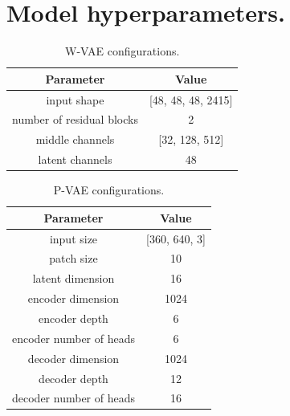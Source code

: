 \documentclass{article}
\theoremstyle{plain}
\theoremstyle{definition}
\theoremstyle{remark}
\begin{document}
\section{Model hyperparameters.}\label{app:model}

\begin{table}[htb!]
\centering
\begin{tabular}{cc}\toprule  
Parameter & Value \\
\midrule
input shape & [48, 48, 48, 2415] \\
number of residual blocks & 2 \\
middle channels & [32, 128, 512] \\
latent channels & 48 \\
\bottomrule
\end{tabular}\caption{W-VAE configurations.}
\label{table:w-vae}
\end{table}

\begin{table}[htb!]
\centering
\begin{tabular}{cc}\toprule  
Parameter & Value \\
\midrule
input size & [360, 640, 3] \\
patch size & 10 \\
latent dimension & 16 \\
encoder dimension & 1024 \\
encoder depth & 6 \\
encoder number of heads & 6 \\
decoder dimension & 1024 \\
decoder depth & 12 \\
decoder number of heads & 16 \\
\bottomrule
\end{tabular}\caption{P-VAE configurations.}
\label{table:p-vae}
\end{table}
\end{document}
